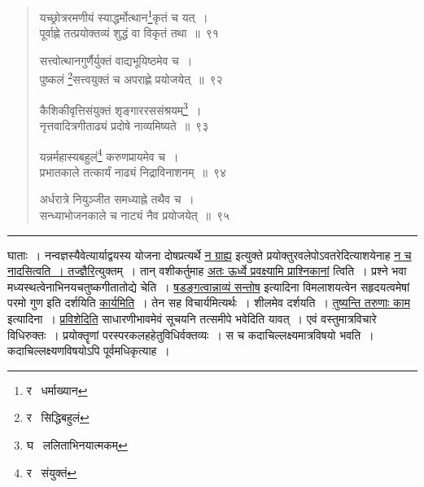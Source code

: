 \documentclass[11pt, openany]{book}
\begin{document}
\begin{quote}
{\na यच्छ्रोत्ररमणीयं स्याद्धर्मोत्थान\renewcommand{\thefootnote}{1}\footnote{र \textendash\  धर्माख्यान}कृतं च यत्~।\\
पूर्वाह्णे तत्प्रयोक्तव्यं शुद्धं वा विकृतं तथा~॥~९१

सत्त्वोत्थानगुर्णैर्युक्तं वाद्यभूयिष्ठमेव च~।\\
पुष्कलं \renewcommand{\thefootnote}{2}\footnote{र \textendash\  सिद्धिबहुलं}सत्त्वयुक्तं च अपराह्णे प्रयोजयेत्~॥~९२

कैशिकीवृत्तिसंयुक्तं शृङ्गाररससंश्रयम्\renewcommand{\thefootnote}{3}\footnote{घ \textendash\  ललिताभिनयात्मकम्}~।\\
नृत्तवादित्रगीताढ्यं प्रदोषे नाव्यमिष्यते~॥~९३

यन्नर्महास्यबहुलं\renewcommand{\thefootnote}{4}\footnote{र \textendash\  संयुक्तं} करुणप्रायमेव च~।\\
प्रभातकाले तत्कार्यं नाढ्यं निद्राविनाशनम्~॥~९४

अर्धरात्रे नियुञ्जीत समध्याह्ने तथैव च~।\\
सन्ध्याभोजनकाले च नाट्यं नैव प्रयोजयेत्~॥~९५}
\end{quote}

\hrule

\vspace{2mm}
\noindent
घाताः~। नन्वज्ञस्यैवेत्यार्याद्वयस्य योजना दोषप्रत्यर्थे \underline{न ग्राह्य} इत्युक्ते प्रयोक्तुरवलेपोऽवतरेदित्याशयेनाह \underline{न च नादसित्वति~। तज्ज्ञैरि}त्युक्तम्~। तान् वशीकर्तुमाह \underline{अतः ऊर्ध्वे प्रवक्ष्यामि प्राश्निकानां} त्विति~। प्रश्ने भवा मध्यस्थत्वेनाभिनयचतुष्कगीतातोद्ये चेति~। \underline{षडङ्गत्वान्नाव्यं सन्तोष} इत्यादिना विमलाशयत्वेन सहृदयत्वमेषां परमो गुण इति दर्शयिति \underline{कार्यमिति}~। तेन सह विचार्यमित्यर्थः~। शीलमेव दर्शयति~। \underline{तुष्यन्ति तरुणाः काम} इत्यादिना~। \underline{प्रविशेदिति} साधारणीभावमेवं सूचयनि तत्समीपे भवेदिति यावत्~। एवं वस्तुमात्रविचारे विधिरुक्तः~। प्रयोक्तॄणां परस्परकलहहेतुविधिर्वक्तव्यः~। स च कदाचिल्लक्ष्यमात्रविषयो भवति~। कदाचिल्लक्ष्यणविषयोऽपि पूर्वमधिकृत्याह~।

\newpage
\end{document}
